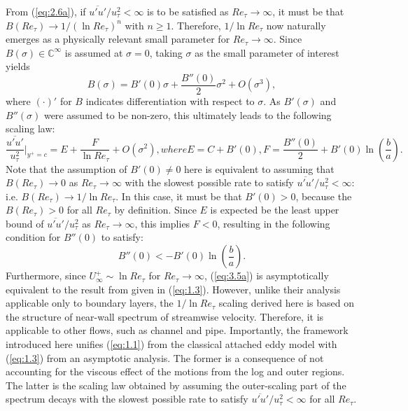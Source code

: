 \documentclass{jfm}
\begin{document}
From (\ref{eq:2.6a}), if $\overline{u'u'}/u_\tau^2 < \infty$ is to be satisfied as $Re_\tau \rightarrow \infty$, it must be that $B(Re_\tau) \rightarrow 1/(\ln Re_\tau)^n$ with $n\geq 1$. Therefore, $1/\ln Re_\tau$ now naturally emerges as a physically relevant small parameter for $Re_\tau \rightarrow \infty$. Since $B(\sigma)\in \mathbb{C}^\infty$ is assumed at $\sigma=0$, taking $\sigma$ as the small parameter of interest yields
\begin{equation}\label{eq:3.4}
B(\sigma)=B'(0)\sigma+\frac{B''(0)}{2}\sigma^2+O(\sigma^3),
\end{equation}
where $(\cdot)'$ for $B$ indicates differentiation with respect to $\sigma$. As $B'(\sigma)$ and $B''(\sigma)$ were assumed to be non-zero, this ultimately leads to the following scaling law:
\begin{subequations}\label{eq:3.5}
\begin{equation}\label{eq:3.5a}
\frac{\overline{u'u'}}{u_\tau^2}\Big|_{y^+=c}=E+\frac{F}{\ln Re_\tau}+O(\sigma^2),
\end{equation}
where
\begin{equation}
E=C+B'(0),
\end{equation}
\begin{equation}
F=\frac{B''(0)}{2}+B'(0)\ln\left(\frac{b}{a}\right).
\end{equation}
\end{subequations}
Note that the assumption of $B'(0) \ne 0$ here is equivalent to assuming that $B(Re_\tau) \rightarrow 0$ as $Re_\tau \rightarrow \infty$ with the slowest possible rate to satisfy $\overline{u'u'}/u_\tau^2 < \infty$: i.e. $B(Re_\tau) \rightarrow 1/\ln Re_\tau$. In this case, it must be that $B'(0)>0$, because the $B(Re_\tau)>0$ for all $Re_\tau$ by definition. Since $E$ is expected be the least upper bound of $\overline{u'u'}/u_\tau^2$ as $Re_\tau \rightarrow \infty$, this implies $F<0$, resulting in the following condition for $B''(0)$ to satisfy:
\begin{equation}\label{eq:3.6}
B''(0)<-B'(0)\ln \left(\frac{b}{a}\right).
\end{equation}
Furthermore, since $U_\infty^+ \sim \ln Re_\tau$ for $Re_\tau \rightarrow \infty$, (\ref{eq:3.5a}) is asymptotically equivalent to the result from \cite{Monkewitz2015} given in (\ref{eq:1.3}). However, unlike their analysis applicable only to boundary layers, the $1/\ln Re_\tau$ scaling derived here is based on the structure of near-wall spectrum of streamwise velocity. Therefore, it is applicable to other flows, such as channel and pipe. Importantly, the framework introduced here unifies (\ref{eq:1.1}) from the classical attached eddy model with (\ref{eq:1.3}) from an asymptotic analysis. The former is a consequence of not accounting for the viscous effect of the motions from the log and outer regions. The latter is the scaling law obtained by assuming the outer-scaling part of the spectrum decays with the slowest possible rate to satisfy $\overline{u'u'}/u_\tau^2 < \infty$ for all $Re_\tau$.
\end{document}
